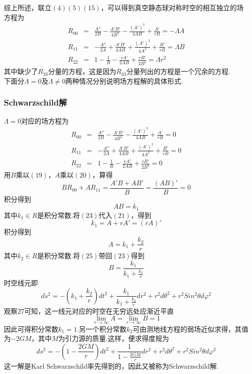 	综上所述，联立$(4)(5)(15)$，可以得到真空静态球对称时空的相互独立的场方程为
	\begin{eqnarray}
		  R_{00}&=&\frac{A''}{2B}-\frac{A'B'}{4B^2}-\frac{(A')^2}{4AB}+\frac{A'}{rB}=-\Lambda A\\
		  R_{11}&=&-\frac{A''}{2A}+\frac{A'B'}{4AB}+\frac{(A')^2}{4A^2}+\frac{B'}{rB}=\Lambda B\\
		  R_{22}&=&1-\frac{1}{B}-\frac{rA'}{2AB}+\frac{rB'}{2B^2}=\Lambda r^2
	\end{eqnarray}
	其中缺少了$R_{33}$分量的方程，这是因为$R_{33}$分量列出的方程是一个冗余的方程.\\
	
	
	下面分$\Lambda=0$及$\Lambda\ne0$两种情况分别说明场方程解的具体形式.
	\subsubsection{Schwarzschild解}
	$\Lambda=0$对应的场方程为
	\begin{eqnarray}
		  R_{00}&=&\frac{A''}{2B}-\frac{A'B'}{4B^2}-\frac{(A')^2}{4AB}+\frac{A'}{rB}=0\\
		  R_{11}&=&-\frac{A''}{2A}+\frac{A'B'}{4AB}+\frac{(A')^2}{4A^2}+\frac{B'}{rB}=0\\
		  R_{22}&=&1-\frac{1}{B}-\frac{rA'}{2AB}+\frac{rB'}{2B^2}=0
	\end{eqnarray}
	用$B$乘以$(19)$，$A$乘以$(20)$，算得
	\begin{equation}
		  BR_{00}+AR_{11}=\frac{A'B+AB'}{B}=\frac{(AB)'}{B}=0
	\end{equation}
	积分得到
	\begin{equation}
		  AB=k_1
	\end{equation}
	其中$k_1\in R$是积分常数.将$(23)$代入$(21)$，得到
	\begin{equation}
		  k_1=A+rA'=(rA)'
	\end{equation}
	积分得到
	\begin{equation}
		  A=k_1+\frac{k_2}{r}
	\end{equation}
	其中$k_2\in R$是积分常数.将$(25)$带回$(23)$得到
	\begin{equation}
		  B=\frac{k_1}{k_1+\frac{k_2}{r}}
	\end{equation}
	时空线元即
	\begin{equation}
		  ds^2=-\left(k_1+\frac{k_2}{r}\right)dt^2+\frac{k_1}{k_1+\frac{k_2}{r}}dr^2+r^2d\theta^2+r^2Sin^2\theta d\varphi^2
	\end{equation}
	观察$27$可知，这一线元对应的时空在无穷远处应渐近平直
	\begin{equation}
		  {\lim_{r \to \infty}A}={\lim_{r \to \infty}B}=1
	\end{equation}
	因此可得积分常数$k_1=1$.另一个积分常数$k_2$可由测地线方程的弱场近似求得，其值为$-2GM$，其中$M$为引力源的质量.这样，便求得度规为
	\begin{equation}
		  ds^2=-\left(1-\frac{2GM}{r}\right)dt^2+\frac{1}{1-\frac{2GM}{r}}dr^2+r^2d\theta^2+r^2Sin^2\theta d\varphi^2
	\end{equation}
	这一解是Karl Schwarzschild率先得到的，因此又被称为Schwarzschild解.
	
